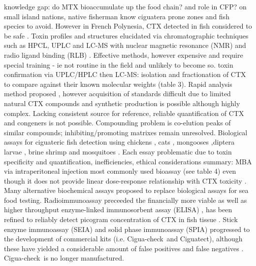 knowledge gap: do MTX bioaccumulate up the food chain? and role in CFP?
on small island nations, native fisherman know ciguatera prone zones and fish species to avoid. However in French Polynesia, CTX detected in fish considered to be safe \cite{darius2007ciguatera}.
Toxin profiles and structures elucidated via chromatographic techniques such as HPCL, UPLC and LC-MS with nuclear magnetic resonance (NMR) \cite{legrand1989isolation,murata1990structures,murata1990structures,satake1996isolation} and radio ligand binding (RLB) \cite{hamilton2002multiple,hamilton2002isolation}. Effective methods, however expensive and require special training - ie not routine in the field and unlikely to become so. 
toxin confirmation via UPLC/HPLC then LC-MS: isolation and fractionation of CTX to compare against their known molecular weights (table 3). Rapid analysis method proposed \cite{lewis2009rapid}, however acquisition of standards difficult due to limited natural CTX compounds \cite{berdalet2012global} and synthetic production is possible \cite{hirama2001total} although highly complex. Lacking consistent source for reference, reliable quantification of CTX and congeners is not possible. Compounding problem is co-elution peaks of similar compounds; inhibiting/promoting matrixes remain unresolved.
Biological assays for ciguateric fish detection using chickens \cite{}, cats \cite{larson1967ciguatera}, mongooses \cite{hokama1977radioimmunoassay},diptera larvae \cite{labrousse1996toxicological}, brine shrimp \cite{granade1976ciguatera} and mosquitoes \cite{bagnis1987use}. Each essay problematic due to toxin specificity and quantification, inefficiencies, ethical considerations summary: \cite{dickey2010ciguatera}
MBA via intraperitoneal injection most commonly used bioassay (see table 4) even though it does not provide linear dose-response relationship with CTX toxicity \cite{hoffman1983mouse}. 
Many alternative biochemical assays proposed to replace biological assays for sea food testing. Radioimmunoassay \cite{hokama1977radioimmunoassay} preceeded the financially more viable as well as higher throughput enzyme-linked immunosorbent assay (ELISA) \cite{hokama1983rapid}, has been refined to reliably detect picogram concentration of CTX in fish tissue \cite{campora2008detection,campora2010evaluating}.
Stick enzyme immunoassay (SEIA) \cite{hokama1985rapid} and solid phase immunoassay (SPIA) \cite{hokama1990simplified} progressed to the development of commercial kits (i.e. Cigua-check\textregistered \ and Ciguatect\textregistered), although these have yielded a considerable amount of false positives and false negatives \cite{wong2005study}. Cigua-check\textregistered \ is no longer manufactured.

